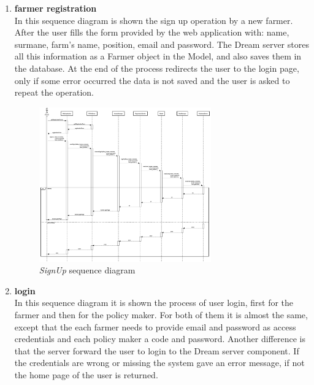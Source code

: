 \begin{enumerate}
    \item \textbf{farmer registration}\\
    In this sequence diagram is shown the sign up operation by a new farmer. After the user fills the form provided by the web application with: name, surmane, farm's name, position, email and password. The Dream server stores all this information as a Farmer object in the Model, and also saves them in the database. At the end of the process redirects the user to the login page, only if some error occurred the data is not saved and the user is asked to repeat the operation.
    \begin{figure}[H]
        \begin{center}
        \includegraphics[width=0.7\textwidth]{sequence/signup.png}
        \caption{\emph{SignUp} sequence diagram}
        \label{fig:sequence1}
        \end{center}
    \end{figure}
    \item \textbf{login}\\
    In this sequence diagram it is shown the process of user login, first for the farmer and then for the policy maker. For both of them it is almost the same, except that the each farmer needs to provide email and password as access credentials and each policy maker a code and password. Another difference is that the server forward the user to login to the Dream server component. If the credentials are wrong or missing the system gave an error message, if not the home page of the user is returned.
    \begin{figure}[H]
        \begin{center}

\end{center}
\end{figure}
\end{enumerate}
